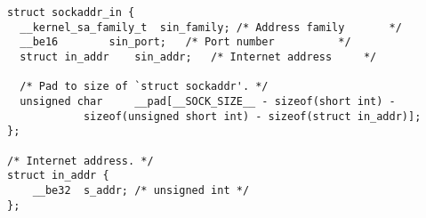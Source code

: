
\begin{lstlisting}
struct sockaddr_in {
  __kernel_sa_family_t	sin_family;	/* Address family		*/
  __be16		sin_port;	/* Port number			*/
  struct in_addr	sin_addr;	/* Internet address		*/

  /* Pad to size of `struct sockaddr'. */
  unsigned char		__pad[__SOCK_SIZE__ - sizeof(short int) -
			sizeof(unsigned short int) - sizeof(struct in_addr)];
};

/* Internet address. */
struct in_addr {
	__be32	s_addr; /* unsigned int */
};
\end{lstlisting}
